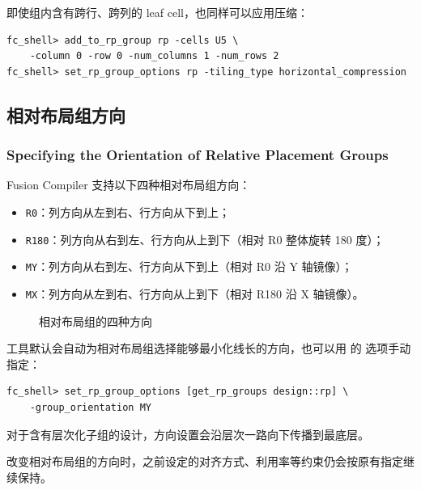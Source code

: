 即使组内含有跨行、跨列的 leaf cell，也同样可以应用压缩：
\begin{lstlisting}
fc_shell> add_to_rp_group rp -cells U5 \
    -column 0 -row 0 -num_columns 1 -num_rows 2
fc_shell> set_rp_group_options rp -tiling_type horizontal_compression
\end{lstlisting}

\subsection{相对布局组方向}
\subsubsection*{Specifying the Orientation of Relative Placement Groups}

Fusion Compiler 支持以下四种相对布局组方向：
\begin{itemize}
  \item \texttt{R0}：列方向从左到右、行方向从下到上；
  \item \texttt{R180}：列方向从右到左、行方向从上到下（相对 R0 整体旋转 180 度）；
  \item \texttt{MY}：列方向从右到左、行方向从下到上（相对 R0 沿 Y 轴镜像）；
  \item \texttt{MX}：列方向从左到右、行方向从上到下（相对 R180 沿 X 轴镜像）。
\end{itemize}

\begin{figure}[htbp]
\centering
{}
\caption{相对布局组的四种方向}
\label{fig:rp-orient}
\end{figure}

工具默认会自动为相对布局组选择能够最小化线长的方向，也可以用  的  选项手动指定：
\begin{lstlisting}
fc_shell> set_rp_group_options [get_rp_groups design::rp] \
    -group_orientation MY
\end{lstlisting}

对于含有层次化子组的设计，方向设置会沿层次一路向下传播到最底层。

\begin{noteBox}
改变相对布局组的方向时，之前设定的对齐方式、利用率等约束仍会按原有指定继续保持。
\end{noteBox}

